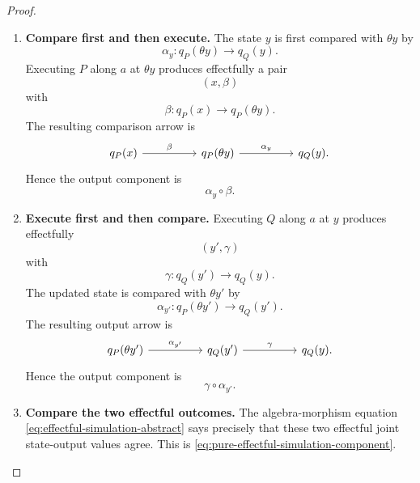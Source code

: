 \begin{proof}
    \leavevmode
    \begin{enumerate}
        \item \textbf{Compare first and then execute.}
        The state \(y\) is first compared with \(\theta y\) by
        \[
            \alpha_y:
            q_P(\theta y)\to q_Q(y).
        \]
        Executing \(P\) along \(a\) at \(\theta y\) produces effectfully a
        pair
        \[
            (x,\beta)
        \]
        with
        \[
            \beta:
            q_P(x)\to q_P(\theta y).
        \]
        The resulting comparison arrow is
        \[
            \begin{tikzcd}[column sep=huge]
                    q_P(x)
                        \arrow[r, "\beta"]
                &
                    q_P(\theta y)
                        \arrow[r, "\alpha_y"]
                &
                    q_Q(y).
            \end{tikzcd}
        \]
        Hence the output component is
        \[
            \alpha_y\circ\beta.
        \]

        \item \textbf{Execute first and then compare.}
        Executing \(Q\) along \(a\) at \(y\) produces effectfully
        \[
            (y',\gamma)
        \]
        with
        \[
            \gamma:
            q_Q(y')\to q_Q(y).
        \]
        The updated state is compared with \(\theta y'\) by
        \[
            \alpha_{y'}:
            q_P(\theta y')\to q_Q(y').
        \]
        The resulting output arrow is
        \[
            \begin{tikzcd}[column sep=huge]
                    q_P(\theta y')
                        \arrow[r, "\alpha_{y'}"]
                &
                    q_Q(y')
                        \arrow[r, "\gamma"]
                &
                    q_Q(y).
            \end{tikzcd}
        \]
        Hence the output component is
        \[
            \gamma\circ\alpha_{y'}.
        \]

        \item \textbf{Compare the two effectful outcomes.}
        The algebra-morphism equation
        \eqref{eq:effectful-simulation-abstract} says precisely that these two
        effectful joint state-output values agree. This is
        \eqref{eq:pure-effectful-simulation-component}.
    \end{enumerate}
\end{proof}

